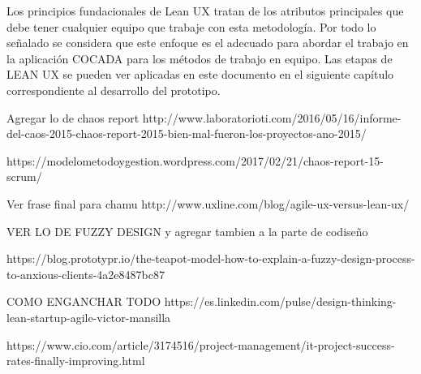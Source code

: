 


Los principios fundacionales de Lean UX tratan de los atributos principales que debe tener cualquier equipo que trabaje con esta metodología.
Por todo lo señalado se considera que este enfoque es el adecuado para abordar el trabajo en la aplicación COCADA para los métodos de trabajo en equipo.
Las etapas de LEAN UX se pueden ver aplicadas en este documento en el siguiente capítulo correspondiente al desarrollo del prototipo.



Agregar lo de chaos report http://www.laboratorioti.com/2016/05/16/informe-del-caos-2015-chaos-report-2015-bien-mal-fueron-los-proyectos-ano-2015/

https://modelometodoygestion.wordpress.com/2017/02/21/chaos-report-15-scrum/

Ver frase final para chamu
http://www.uxline.com/blog/agile-ux-versus-lean-ux/



VER LO DE FUZZY DESIGN y agregar tambien a la parte de codiseño

https://blog.prototypr.io/the-teapot-model-how-to-explain-a-fuzzy-design-process-to-anxious-clients-4a2e8487bc87


COMO ENGANCHAR TODO
https://es.linkedin.com/pulse/design-thinking-lean-startup-agile-victor-mansilla


https://www.cio.com/article/3174516/project-management/it-project-success-rates-finally-improving.html



